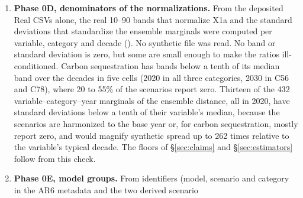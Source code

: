 \documentclass[11pt,a4paper]{article}
\newcommand{\prop}[1]{#1}
\newcommand{\prop}[1]{\textcolor{blue}{#1}}
\begin{document}
\begin{enumerate}[nosep]
  and Extended Data Table~3's those of the sixteen-variable ``Secondary''
  notebooks, up to two slips (batch size 25, not 30, for the C78 VAE and
  decay steps 1{,}000, not 200, for the RCGAN), which resolves D4 in favour
  of the code. Every generative notebook runs its own label-transfer test,
  and the test-set sizes of Extended Data Table~2 (554/237/110) occur only
  in the Secondary notebooks, so the published comparison of the three
  generators was like-for-like (D12). That test uses a random forest tuned
  by three-fold grid search, 1{,}000 synthetic scenarios per category and,
  as inputs, the trapezoid-cumulated 2020--2100 values of fifteen variables,
  Kyoto Gases excluded. The deposit also holds unreported variants of all
  three generators with seven to nine variables, added in the order of the
  eight-category ranking of SI Fig.~S3b and without saved outputs (D14). No
  code for the electricity sum-check exists in either version of the
  deposit. Recomputed on the 901-set, the AR6 average error is 1.43\% when
  each scenario's error is averaged over the nine decades, and none of six
  aggregations fixed before the computation rounds to the paper's 1.2\%. The
  distribution is highly skewed: half of all scenario-decades have errors
  below 0.011\%, so the average is driven by a minority of scenarios (D13).
\item \textbf{Phase 0D, denominators of the normalizations.} From the
  deposited Real CSVs alone, the real 10--90 bands that normalize X1a and
  the standard deviations that standardize the ensemble marginals were
  computed per variable, category and decade
  (). No synthetic file was read. No
  band or standard deviation is zero, but some are small enough to make
  the ratios ill-conditioned. Carbon sequestration has bands below a tenth
  of its median band over the decades in five cells (2020 in all three
  categories, 2030 in C56 and C78), where 20 to 55\% of the scenarios
  report zero. Thirteen of the 432 variable--category--year marginals of
  the ensemble distance, all in 2020, have standard deviations below a
  tenth of their variable's median, because the scenarios are harmonized
  to the base year or, for carbon sequestration, mostly report zero, and
  would magnify synthetic spread up to 262 times relative
  to the variable's typical decade. The floors of \S\ref{sec:claims} and
  \S\ref{sec:estimators} follow from this check.
\item \prop{\textbf{Phase 0E, model groups.} From identifiers (model,
  scenario and category in the AR6 metadata and the two derived scenario
}
\end{enumerate}
\end{document}
